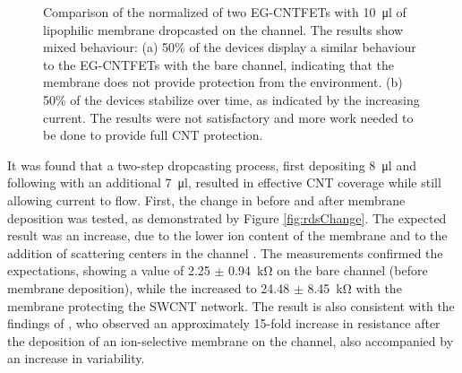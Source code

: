 \begin{figure}
    \centering
    \caption{
        Comparison of the normalized \ids{} of two EG-CNTFETs with \SI{10}{\micro\l} of lipophilic membrane dropcasted on the channel. The results show mixed behaviour: 
        (a) 50\% of the devices display a similar behaviour to the EG-CNTFETs with the bare channel, indicating that the membrane does not provide protection from the environment.
        (b) 50\% of the devices stabilize over time, as indicated by the increasing current. The results were not satisfactory and more work needed to be done to provide full CNT protection.}
    \label{fig:membrane10ul}
\end{figure}

It was found that a two-step dropcasting process, \ie{} first depositing \SI{8}{\ul} and following with an additional \SI{7}{\ul}, resulted in effective CNT coverage while still allowing current to flow.
First, the change in \rds{} before and after membrane deposition was tested, as demonstrated by Figure \ref{fig:rdsChange}. The expected result was an increase, due to the lower ion content of the membrane and to the addition of scattering centers in the channel \citep{joshiUnderstanding2018}. The measurements confirmed the expectations, showing a value of \SI{2.25}{} $\pm$ \SI{0.94}{\kohm} on the bare channel (before membrane deposition), while the \rds{} increased to \SI{24.48}{} $\pm$ \SI{8.45}{\kohm} with the membrane protecting the SWCNT network. The result is also consistent with the findings of \citet{petrelliMethod2023}, who observed an approximately 15-fold increase in resistance after the deposition of an ion-selective membrane on the channel, also accompanied by an increase in variability.

